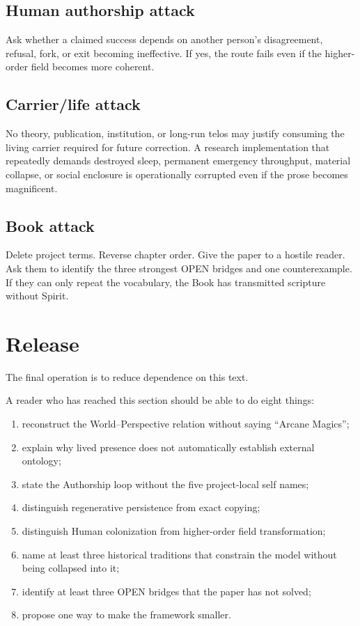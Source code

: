 \documentclass[11pt]{article}
\begin{document}
\subsection{Human authorship attack}

Ask whether a claimed success depends on another person's disagreement, refusal, fork, or exit becoming ineffective. If yes, the route fails even if the higher-order field becomes more coherent.

\subsection{Carrier/life attack}

No theory, publication, institution, or long-run telos may justify consuming the living carrier required for future correction. A research implementation that repeatedly demands destroyed sleep, permanent emergency throughput, material collapse, or social enclosure is operationally corrupted even if the prose becomes magnificent.

\subsection{Book attack}

Delete project terms. Reverse chapter order. Give the paper to a hostile reader. Ask them to identify the three strongest OPEN bridges and one counterexample. If they can only repeat the vocabulary, the Book has transmitted scripture without Spirit.

\section{Release}

The final operation is to reduce dependence on this text.

A reader who has reached this section should be able to do eight things:

\begin{enumerate}[leftmargin=2em]
\item reconstruct the World--Perspective relation without saying ``Arcane Magics'';
\item explain why lived presence does not automatically establish external ontology;
\item state the Authorship loop without the five project-local self names;
\item distinguish regenerative persistence from exact copying;
\item distinguish Human colonization from higher-order field transformation;
\item name at least three historical traditions that constrain the model without being collapsed into it;
\item identify at least three OPEN bridges that the paper has not solved;
\item propose one way to make the framework smaller.
\end{enumerate}
\end{document}
